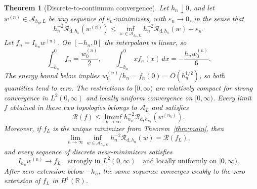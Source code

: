 \documentclass[11pt]{article}
\newtheorem{theorem}{Theorem}[section]
\theoremstyle{definition}
\theoremstyle{remark}
\newcommand{\Rcal}{\mathcal R}
\begin{document}
\begin{theorem}[Discrete-to-continuum convergence]
\label{thm:discrete-continuum}
Let $h_n\downarrow0$, and let $w^{(n)}\in\mathcal A_{h_n,L}$ be any sequence of
$\varepsilon_n$-minimizers, with $\varepsilon_n\to0$, in the sense that
\[
 h_n^{-2}\Rcal_{\mathrm d,h_n}(w^{(n)})
 \leq \inf_{w\in\mathcal A_{h_n,L}}
       h_n^{-2}\Rcal_{\mathrm d,h_n}(w)+\varepsilon_n.
\]
Let $f_n=I_{h_n}w^{(n)}$. On $[-h_n,0]$ the interpolant is linear, so
\[
 \int_{-h_n}^0 f_n=\frac{w^{(n)}_0}{2},
 \qquad
 \int_{-h_n}^0 x f_n(x)\,dx=-\frac{h_n w^{(n)}_0}{6}.
\]
The energy bound below implies $w^{(n)}_0/h_n=f_n(0)=O(h_n^{1/2})$, so both
quantities tend to zero. The restrictions to $[0,\infty)$ are relatively
compact for strong convergence in $L^2(0,\infty)$ and locally uniform
convergence on $[0,\infty)$. Every limit $f$ obtained in these two topologies
belongs to $\mathcal A_L$ and satisfies
\[
 \Rcal(f)\leq\liminf_{k\to\infty}
 h_{n_k}^{-2}\Rcal_{\mathrm d,h_{n_k}}(w^{(n_k)}).
\]
Moreover, if $f_L$ is the unique minimizer from Theorem~\ref{thm:main}, then
\[
 \lim_{n\to\infty}
 \inf_{w\in\mathcal A_{h_n,L}}
 h_n^{-2}\Rcal_{\mathrm d,h_n}(w)
 =\Rcal(f_L),
\]
and every sequence of discrete near-minimizers satisfies
\[
 I_{h_n}w^{(n)}\longrightarrow f_L
 \quad\text{strongly in }L^2(0,\infty)
 \quad\text{and locally uniformly on }[0,\infty).
\]
After zero extension below $-h_n$, the same sequence converges weakly to the
zero extension of $f_L$ in $H^1(\mathbb R)$.
\end{theorem}
\end{document}

